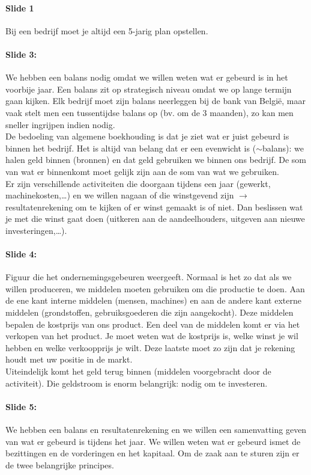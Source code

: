 \documentclass[10pt,a4paper]{report}
\begin{document}
\paragraph{Slide 1} Bij een bedrijf moet je altijd een 5-jarig plan opstellen.

\paragraph{Slide 3:} We hebben een balans nodig omdat we willen weten wat er gebeurd is in het voorbije jaar. Een balans zit op strategisch niveau omdat we op lange termijn gaan kijken. Elk bedrijf moet zijn balans neerleggen bij de bank van Belgi\"e, maar vaak stelt men een tussentijdse balans op (bv. om de 3 maanden), zo kan men sneller ingrijpen indien nodig. \\
De bedoeling van algemene boekhouding is dat je ziet wat er juist gebeurd is binnen het bedrijf. Het is altijd van belang dat er een evenwicht is ($\sim$balans): we halen geld binnen (bronnen) en dat geld gebruiken we binnen ons bedrijf. De som van wat er binnenkomt moet gelijk zijn aan de som van wat we gebruiken.\\
Er zijn verschillende activiteiten die doorgaan tijdens een jaar (gewerkt, machinekosten,…) en we willen nagaan of die winstgevend zijn $\rightarrow$ resultatenrekening om te kijken of er winst gemaakt is of niet. Dan beslissen wat je met die winst gaat doen (uitkeren aan de aandeelhouders, uitgeven aan nieuwe investeringen,…).

\paragraph{Slide 4:} Figuur die het ondernemingsgebeuren weergeeft. Normaal is het zo dat als we willen produceren, we middelen moeten gebruiken om die productie te doen. Aan de ene kant interne middelen (mensen, machines) en aan de andere kant externe middelen (grondstoffen, gebruiksgoederen die zijn aangekocht). Deze middelen bepalen de kostprijs van ons product. Een deel van de middelen komt er via het verkopen van het product. Je moet weten wat de kostprijs is, welke winst je wil hebben en welke verkoopprijs je wilt. Deze laatste moet zo zijn dat je rekening houdt met uw positie in de markt.\\ Uiteindelijk komt het geld terug binnen (middelen voorgebracht door de activiteit).
Die geldstroom is enorm belangrijk: nodig om te investeren.

\paragraph{Slide 5:} We hebben een balans en resultatenrekening en we willen een samenvatting geven van wat er gebeurd is tijdens het jaar. We willen weten wat er gebeurd ismet de bezittingen en de vorderingen en het kapitaal.
Om de zaak aan te sturen zijn er de twee belangrijke principes.
\end{document}
